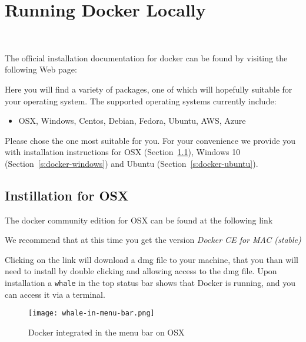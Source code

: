 
\chapter{Running Docker Locally}
\label{S:docker-local}

\FILENAME\

The official installation documentation for docker can be found by
visiting the following Web page:


Here you will find a variety of packages, one of which will hopefully
suitable for your operating system. The supported operating systems
currently include:

\begin{itemize}
\item  OSX, Windows, Centos, Debian, Fedora, Ubuntu, AWS, Azure
\end{itemize}

Please chose the one most suitable for you. For your convenience we
provide you with installation instructions for OSX
(Section~\ref{s:docker-osx}), Windows 10 (Section~\ref{s:docker-windows})
and Ubuntu (Section~\ref{s:docker-ubuntu}).

\section{Instillation for OSX}
\label{s:docker-osx}

The docker community edition for OSX can be found at the following link


We recommend that at this time you get the version \textit{Docker CE for MAC (stable)}


Clicking on the link will download a dmg file to your machine, that
you than will need to install by double clicking and allowing access
to the dmg file. Upon installation a \texttt{whale} in the top status
bar shows that Docker is running, and you can access it via a terminal.

\begin{figure}[htb]
\centering
\texttt{[image: whale-in-menu-bar.png]}
\caption{Docker integrated in the menu bar on OSX}
\end{figure}

